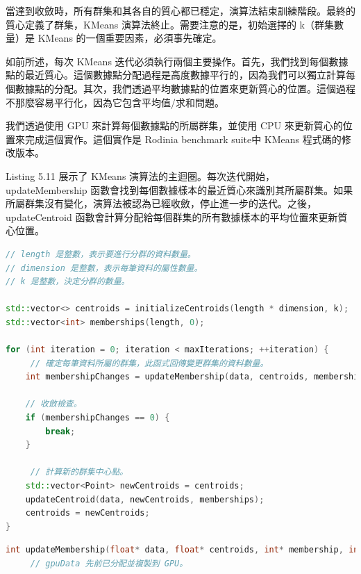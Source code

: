 {當達到收斂時，所有群集和其各自的質心都已穩定，演算法結束訓練階段。最終的質心定義了群集，KMeans 演算法終止。需要注意的是，初始選擇的 k（群集數量）是 KMeans 的一個重要因素，必須事先確定。


如前所述，每次 KMeans 迭代必須執行兩個主要操作。首先，我們找到每個數據點的最近質心。這個數據點分配過程是高度數據平行的，因為我們可以獨立計算每個數據點的分配。其次，我們透過平均數據點的位置來更新質心的位置。這個過程不那麼容易平行化，因為它包含平均值/求和問題。


我們透過使用 GPU 來計算每個數據點的所屬群集，並使用 CPU 來更新質心的位置來完成這個實作。這個實作是  Rodinia benchmark
suite中 KMeans 程式碼的修改版本\cite{Shuai2009Rodinia}。


 Listing 5.11 展示了 KMeans 演算法的主迴圈。每次迭代開始， updateMembership 函數會找到每個數據樣本的最近質心來識別其所屬群集。如果所屬群集沒有變化，演算法被認為已經收斂，停止進一步的迭代。之後， updateCentroid 函數會計算分配給每個群集的所有數據樣本的平均位置來更新質心位置。

\lstset{style=mystyle}
\begin{lstlisting}[language=c++,caption={KMeans 的主迴圈}]
// length 是整數，表示要進行分群的資料數量。
// dimension 是整數，表示每筆資料的屬性數量。
// k 是整數，決定分群的數量。

std::vector<> centroids = initializeCentroids(length * dimension, k);
std::vector<int> memberships(length, 0);

for (int iteration = 0; iteration < maxIterations; ++iteration) {
     // 確定每筆資料所屬的群集，此函式回傳變更群集的資料數量。
    int membershipChanges = updateMembership(data, centroids, memberships);

    // 收斂檢查。
    if (membershipChanges == 0) {
        break;
    }

     // 計算新的群集中心點。
    std::vector<Point> newCentroids = centroids;
    updateCentroid(data, newCentroids, memberships);
    centroids = newCentroids;
}

\end{lstlisting}

\lstset{style=mystyle}
\begin{lstlisting}[language=c++,caption={ Listing 5.12：KMeans 的更新所屬群集函數，使用 GPU 加速計算}]
int updateMembership(float* data, float* centroids, int* membership, int dataSize, int dimension, int k) {
     // gpuData 先前已分配並複製到 GPU。


\end{lstlisting}}
